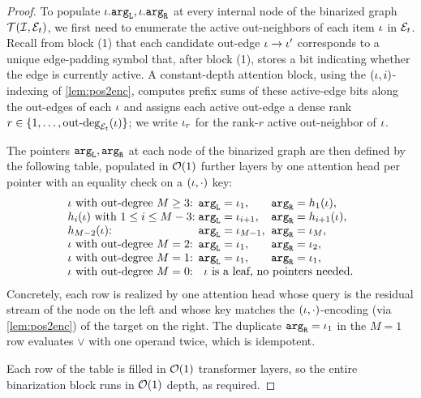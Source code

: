 \documentclass{article}
\begin{document}
\begin{proof}
    To populate ${{ \iota}}.{\mathtt{arg}_\mathtt{L}}, {{ \iota}}.{\mathtt{arg}_\mathtt{R}}$ at every internal node of the binarized graph ${{ \mathcal{T}}}({{\mathcal{I}}}, {\mathcal{E}}_t)$, we first need to enumerate the active out-neighbors of each item ${{ \iota}}$ in ${\mathcal{E}}_t$.
    Recall from block (1) that each candidate out-edge ${{ \iota}} \to {{ \iota}}'$ corresponds to a unique edge-padding symbol that, after block (1), stores a bit indicating whether the edge is currently active.
    A constant-depth attention block, using the $({{ \iota}}, i)$-indexing of \cref{lem:pos2enc}, computes prefix sums of these active-edge bits along the out-edges of each ${{ \iota}}$ and assigns each active out-edge a dense rank $r \in {{\{ 1, \ldots, \mathrm{out\text{-}deg}_{{\mathcal{E}}_t}({{ \iota}}) \}}}$; we write ${{ \iota}}_r$ for the rank-$r$ active out-neighbor of ${{ \iota}}$.
    
    The pointers ${\mathtt{arg}_\mathtt{L}}, {\mathtt{arg}_\mathtt{R}}$ at each node of the binarized graph are then defined by the following table, populated in ${{ \mathcal{O}}}(1)$ further layers by one attention head per pointer with an equality check on a $({{ \iota}}, \cdot)$ key:
    \begin{equation*}
        \begin{array}{l@{\;}c@{\;}l@{\;\;}l}
            \itm \text{ with out-degree } M \ge 3 \text{:}    & \fargL & = \itm_1, & \fargR = h_1(\itm), \\
            h_i(\itm) \text{ with } 1 \le i \le M - 3 \text{:} & \fargL & = \itm_{i+1}, & \fargR = h_{i+1}(\itm), \\
            h_{M-2}(\itm) \text{:}                            & \fargL & = \itm_{M-1}, & \fargR = \itm_M, \\
            \itm \text{ with out-degree } M = 2 \text{:}      & \fargL & = \itm_1, & \fargR = \itm_2, \\
            \itm \text{ with out-degree } M = 1 \text{:}      & \fargL & = \itm_1, & \fargR = \itm_1, \\
            \itm \text{ with out-degree } M = 0 \text{:}      & \multicolumn{3}{l}{\itm \text{ is a leaf, no pointers needed.}}
        \end{array}
    \end{equation*}
    Concretely, each row is realized by one attention head whose query is the residual stream of the node on the left and whose key matches the $({{ \iota}}, \cdot)$-encoding (via \cref{lem:pos2enc}) of the target on the right.
    The duplicate ${\mathtt{arg}_\mathtt{R}} = {{ \iota}}_1$ in the $M = 1$ row evaluates $\lor$ with one operand twice, which is idempotent.
    
    Each row of the table is filled in ${{ \mathcal{O}}}(1)$ transformer layers, so the entire binarization block runs in ${{ \mathcal{O}}}(1)$ depth, as required.
    

\end{proof}
\end{document}
